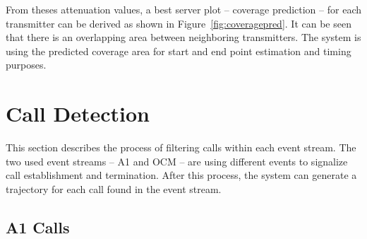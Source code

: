 \documentclass[master,english]{hgbthesis}
\begin{document}


%



















From theses attenuation values, a best server plot -- coverage prediction -- for each transmitter can be derived as shown in Figure~\ref{fig:coveragepred}. It can be seen that there is an overlapping area between neighboring transmitters. The system is using the predicted coverage area for start and end point estimation and timing purposes.

\section{Call Detection}

This section describes the process of filtering calls within each event stream. The two used event streams -- A1 and OCM -- are using different events to signalize call establishment and termination. After this process, the system can generate a trajectory for each call found in the event stream.

\subsection{A1 Calls}
\end{document}
